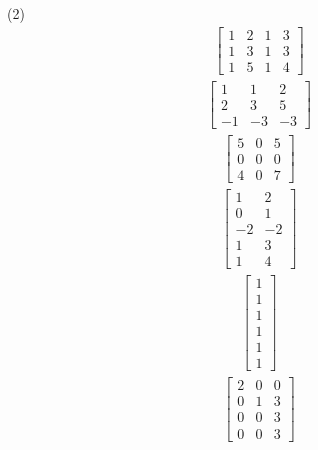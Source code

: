 \begin{tasks}[resume, style=enumerate](2)
\task
  \begin{align*}
    \begin{bmatrix}
      1 & 2 & 1 & 3 \\
      1 & 3 & 1 & 3 \\
      1 & 5 & 1 & 4
    \end{bmatrix}
  \end{align*}
\task
  \begin{align*}
    \begin{bmatrix}
      1 & 1 & 2 \\
      2 & 3 & 5 \\
      -1 & -3 & -3
    \end{bmatrix}
  \end{align*}
\task
  \begin{align*}
    \begin{bmatrix}
      5 & 0 & 5 \\
      0 & 0 & 0 \\
      4 & 0 & 7
    \end{bmatrix}
  \end{align*}
\task
  \begin{align*}
    \begin{bmatrix}
      1 & 2 \\
      0 & 1 \\
      -2 & -2 \\
      1 & 3 \\
      1 & 4
    \end{bmatrix}
  \end{align*}
\task
  \begin{align*}
    \begin{bmatrix}
      1 \\ 1 \\ 1 \\ 1 \\ 1 \\ 1
    \end{bmatrix}
  \end{align*}
\task
  \begin{align*}
    \begin{bmatrix}
      2 & 0 & 0 \\
      0 & 1 & 3 \\
      0 & 0 & 3 \\
      0 & 0 & 3
    \end{bmatrix}
  \end{align*}
\task
  \begin{align*}

\end{align*}
\end{tasks}
